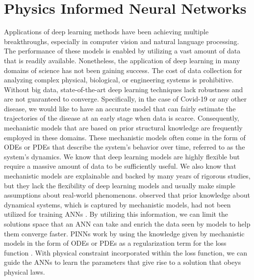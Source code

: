 \section{Physics Informed Neural Networks}

Applications of deep learning methods have been achieving multiple breakthroughs, especially in computer vision and natural language processing.
The performance of these models is enabled by utilizing a vast amount of data that is readily available.
Nonetheless, the application of deep learning in many domains of science has not been gaining success.
The cost of data collection for analyzing complex physical, biological, or engineering systems is prohibitive.
Without big data, state-of-the-art deep learning techniques lack robustness and are not guaranteed to converge.
Specifically, in the case of Covid-19 or any other disease, we would like to have an accurate model that can fairly estimate the trajectories of the disease at an early stage when data is scarce.
Consequently, mechanistic models that are based on prior structural knowledge are frequently employed in these domains.
These mechanistic models often come in the form of \glspl{ODE} or \glspl{PDE} that describe the system's behavior over time, referred to as the system's dynamics.
We know that deep learning models are highly flexible but require a massive amount of data to be sufficiently useful.
We also know that mechanistic models are explainable and backed by many years of rigorous studies, but they lack the flexibility of deep learning models and usually make simple assumptions about real-world phenomenons.
\citeauthor{raissiPhysicsinformedNeuralNetworks2019} observed that prior knowledge about dynamical systems, which is captured by mechanistic models, had not been utilized for training \glspl{ANN} \cite{raissiPhysicsinformedNeuralNetworks2019}.
By utilizing this information, we can limit the solutions space that an \gls{ANN} can take and enrich the data seen by models to help them converge faster.
\glspl{PINN} work by using the knowledge given by mechanistic models in the form of \glspl{ODE} or \glspl{PDE} as a regularization term for the loss function \cite{raissiPhysicsinformedNeuralNetworks2019, lagarisArtificialNeuralNetworks1998}.
With physical constraint incorporated within the loss function, we can guide the \glspl{ANN} to learn the parameters that give rise to a solution that obeys physical laws.

